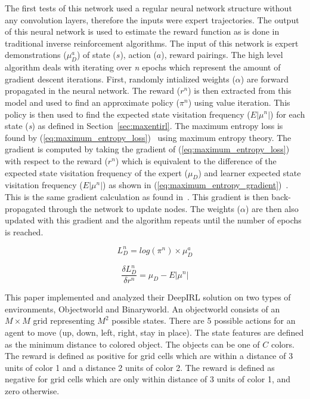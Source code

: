 \documentclass[12pt,american]{report}
\begin{document}
The first tests of this network used a regular neural network structure without any convolution layers, therefore the inputs were expert trajectories. The output of this neural network is used to estimate the reward function as is done in traditional inverse reinforcement algorithms. The input of this network is expert demonstrations ($\mu_{D}^{a}$) of state ($s$), action ($a$), reward pairings. The high level algorithm deals with iterating over \textit{n} epochs which represent the amount of gradient descent iterations. First, randomly intialized weights ($\alpha$) are forward propagated in the neural network.  The reward ($r^n$) is then extracted from this model and used to find an approximate policy ($\pi^n$) using value iteration. This policy is then used to find the expected state visitation frequency ($E|\mu^n|$) for each state (\textit{s}) as defined in Section~\ref{sec:maxentirl}.  The maximum entropy loss is found by (\ref{eq:maximum_entropy_loss})~\cite{wulfmeier2015maximum} using maximum entropy theory. The gradient is computed by taking the gradient of (\ref{eq:maximum_entropy_loss}) with respect to the reward ($r^n$) which is equivalent to the difference of the expected state visitation frequency of the expert ($\mu_D$) and learner expected state visitation frequency ($E|\mu^n|$) as shown in (\ref{eq:maximum_entropy_gradient})~\cite{wulfmeier2015maximum}.  This is the same gradient calculation as found in~\cite{ziebart2008maximum}.  This gradient is then back-propagated through the network to update nodes.  The weights ($\alpha$) are then also updated with this gradient and the algorithm repeats until the number of epochs is reached. 

\begin{equation}
            \label{eq:maximum_entropy_loss}
            L_{D}^{n}=log(\pi^n) \times \mu_{D}^{a}%
        \end{equation}

\begin{equation}
            \label{eq:maximum_entropy_gradient}
           \frac{\delta L_{D}^{n}}{\delta r^{n}}=\mu_D -  E|\mu^n|%
        \end{equation}

This paper implemented and analyzed their DeepIRL solution on two types of environments, Objectworld and Binaryworld. An objectworld consists of an $M\times M$ grid representing $M^2$ possible states.  There are 5 possible actions for an agent to move (up, down, left, right, stay in place). The state features are defined as the minimum distance to colored object.  The objects can be one of $C$ colors. The reward is defined as positive for grid cells which are within a distance of 3 units of color 1 and a distance 2 units of color 2. The reward is defined as negative for grid cells which are only within distance of 3 units of color 1, and zero otherwise.  
\end{document}

